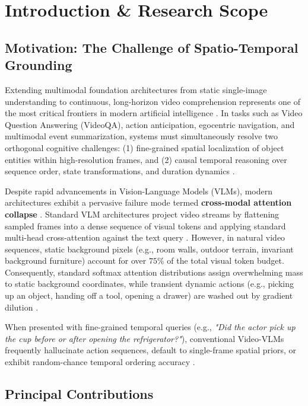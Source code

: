 \documentclass[11pt,a4paper]{article}
\begin{document}
\section{Introduction \& Research Scope}



\subsection{Motivation: The Challenge of Spatio-Temporal Grounding}


Extending multimodal foundation architectures from static single-image understanding to continuous, long-horizon video comprehension represents one of the most critical frontiers in modern artificial intelligence \cite{arxiv_2010_11146,arxiv_2005_14165}. In tasks such as Video Question Answering (VideoQA), action anticipation, egocentric navigation, and multimodal event summarization, systems must simultaneously resolve two orthogonal cognitive challenges: (1) fine-grained spatial localization of object entities within high-resolution frames, and (2) causal temporal reasoning over sequence order, state transformations, and duration dynamics \cite{arxiv_2203_02155,arxiv_2312_03893}.

Despite rapid advancements in Vision-Language Models (VLMs), modern architectures exhibit a pervasive failure mode termed \textbf{cross-modal attention collapse} \cite{arxiv_2406_00584}. Standard VLM architectures project video streams by flattening sampled frames into a dense sequence of visual tokens and applying standard multi-head cross-attention against the text query \cite{arxiv_2305_18290}. However, in natural video sequences, static background pixels (e.g., room walls, outdoor terrain, invariant background furniture) account for over $75\%$ of the total visual token budget. Consequently, standard softmax attention distributions assign overwhelming mass to static background coordinates, while transient dynamic actions (e.g., picking up an object, handing off a tool, opening a drawer) are washed out by gradient dilution \cite{arxiv_2501_02497}.

When presented with fine-grained temporal queries (e.g., \textit{"Did the actor pick up the cup before or after opening the refrigerator?"}), conventional Video-VLMs frequently hallucinate action sequences, default to single-frame spatial priors, or exhibit random-chance temporal ordering accuracy \cite{arxiv_2405_01543,crossref_10_1016_j_aei_2026_104392}.


\subsection{Principal Contributions}
\end{document}
